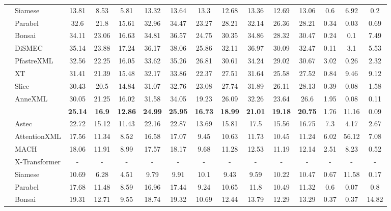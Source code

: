 \begin{table*}
{\begin{tabular}{@{}c|l|ccccc|ccccc|ccc@{}}
	& Siamese	 & 13.81	 & 8.53	 & 5.81	 & 13.32	 & 13.64	 & 13.3	 & 12.68	 & 13.36	 & 12.69	 & 13.06	 & 0.6	 & 6.92	 & 0.2\\
	& Parabel	 & 32.6	 & 21.8	 & 15.61	 & 32.96	 & 34.47	 & 23.27	 & 28.21	 & 32.14	 & 26.36	 & 28.21	 & 0.34	 & 0.03	 & 0.69\\
	& Bonsai	 & 34.11	 & 23.06	 & 16.63	 & 34.81	 & 36.57	 & 24.75	 & 30.35	 & 34.86	 & 28.32	 & 30.47	 & 0.24	 & 0.1	 & 7.49\\
	& DiSMEC	 & 35.14	 & 23.88	 & 17.24	 & 36.17	 & 38.06	 & 25.86	 & 32.11	 & 36.97	 & 30.09	 & 32.47	 & 0.11	 & 3.1	 & 5.53\\
	& PfastreXML	 & 32.56	 & 22.25	 & 16.05	 & 33.62	 & 35.26	 & 26.81	 & 30.61	 & 34.24	 & 29.02	 & 30.67	 & 3.02	 & 0.26	 & 2.32\\
	& XT	 & 31.41	 & 21.39	 & 15.48	 & 32.17	 & 33.86	 & 22.37	 & 27.51	 & 31.64	 & 25.58	 & 27.52	 & 0.84	 & 9.46	 & 9.12\\
	& Slice	 & 30.43	 & 20.5	 & 14.84	 & 31.07	 & 32.76	 & 23.08	 & 27.74	 & 31.89	 & 26.11	 & 28.13	 & 0.39	 & 0.08	 & 1.58\\
	& AnneXML	 & 30.05	 & 21.25	 & 16.02	 & 31.58	 & 34.05	 & 19.23	 & 26.09	 & 32.26	 & 23.64	 & 26.6	 & 1.95	 & 0.08	 & 0.11\\
	 \midrule
	 \multirow{13}{*}{\textbf{\rotatebox{90}{LF-WikiSeeAlsoTitles-320K}}}	& \alg	 & \textbf{25.14}	 & \textbf{16.9}	 & \textbf{12.86}	 & \textbf{24.99}	 & \textbf{25.95}	 & \textbf{16.73}	 & \textbf{18.99}	 & \textbf{21.01}	 & \textbf{19.18}	 & \textbf{20.75}	 & 1.76	 & 11.16	 & 0.09\\
	& Astec	 & 22.72	 & 15.12	 & 11.43	 & 22.16	 & 22.87	 & 13.69	 & 15.81	 & 17.5	 & 15.56	 & 16.75	 & 7.3	 & 4.17	 & 2.67\\
	& AttentionXML	 & 17.56	 & 11.34	 & 8.52	 & 16.58	 & 17.07	 & 9.45	 & 10.63	 & 11.73	 & 10.45	 & 11.24	 & 6.02	 & 56.12	 & 7.08\\
	& MACH	 & 18.06	 & 11.91	 & 8.99	 & 17.57	 & 18.17	 & 9.68	 & 11.28	 & 12.53	 & 11.19	 & 12.14	 & 2.51	 & 8.23	 & 0.52\\
	& X-Transformer	 & -	 & -	 & -	 & -	 & -	 & -	 & -	 & -	 & -	 & -	 & -	 & -	 & -\\
	& Siamese	 & 10.69	 & 6.28	 & 4.51	 & 9.79	 & 9.91	 & 10.1	 & 9.43	 & 9.59	 & 10.22	 & 10.47	 & 0.67	 & 11.58	 & 0.17\\
	& Parabel	 & 17.68	 & 11.48	 & 8.59	 & 16.96	 & 17.44	 & 9.24	 & 10.65	 & 11.8	 & 10.49	 & 11.32	 & 0.6	 & 0.07	 & 0.8\\
	& Bonsai	 & 19.31	 & 12.71	 & 9.55	 & 18.74	 & 19.32	 & 10.69	 & 12.44	 & 13.79	 & 12.29	 & 13.29	 & 0.37	 & 0.37	 & 14.82\\

\end{tabular}}
\end{table*}
